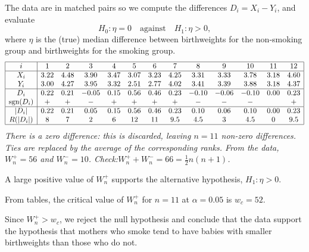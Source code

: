 \begin{solution}
The data are in matched pairs so we compute the differences $D_i=X_i-Y_i$, and evaluate
\[
H_0:\eta = 0 \quad\text{against}\quad H_1:\eta > 0,
\]
where $\eta$ is the (true) median difference between birthweights for the non-smoking group and birthweights for the smoking group.
\[\begin{array}{|c|cccccccccccc|} \hline
i			& 1      &  2     & 3      & 4      & 5      & 6      & 7      & 8      & 9      & 10     & 11     & 12   	\\ \hline
X_i			& 3.22   & 4.48   & 3.90   & 3.47   & 3.07   & 3.23   & 4.25   & 3.31   & 3.33   & 3.78   & 3.18   & 4.60 	\\ 
Y_i			& 3.00   & 4.27   & 3.95   & 3.32   & 2.51   & 2.77   & 4.02   & 3.41   & 3.39   & 3.88   & 3.18   & 4.37	\\ \hline
D_i			& 0.22   & 0.21   & -0.05  & 0.15   & 0.56   & 0.46   & 0.23   & -0.10  & -0.06  & -0.10  & 0.00  	& 0.23	\\
\text{sgn}(D_i)	& +      & +      & -      & +      & +      & +      & +      & -      & -      & -      &      	& +  	\\ \hline
|D_i|		& 0.22   & 0.21   &  0.05  & 0.15   & 0.56   & 0.46   & 0.23   &  0.10  &  0.06  &  0.10  & 0.00  	& 0.23	\\
R(|D_i|)		& 8      & 7      & 2      & 6      & 12     & 11     & 9.5    &  4.5   &  3     &  4.5   & 0     	& 9.5  	\\ \hline
\end{array}\]
\bit
\it There is a zero difference: this is discarded, leaving $n=11$ non-zero differences.
\it Ties are replaced by the average of the corresponding ranks.
\eit
From the data, $W^{+}_n = 56$ and $W^{-}_n = 10$. \qquad Check:\quad $W^{+}_n + W^{-}_n = 66 = \frac{1}{2}n(n+1)$. 
\par
A large positive value of $W^{+}_n$ supports the alternative hypothesis, $H_1:\eta > 0$. 
\par
From tables, the critical value of $W^{+}_n$ for $n=11$ at $\alpha=0.05$ is $w_c = 52$. 
\par
Since $W^{+}_n > w_c$, we reject the null hypothesis and conclude that the data support the hypothesis that mothers who smoke tend to have babies with smaller birthweights than those who do not. 
\end{solution}

